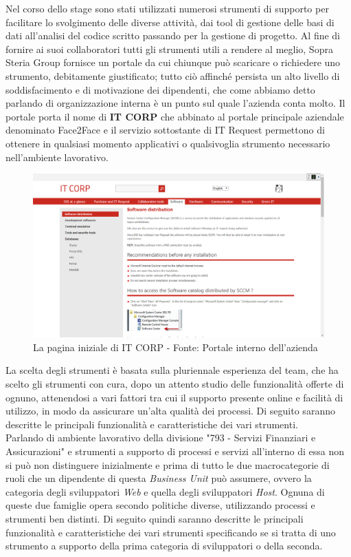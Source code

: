 	Nel corso dello stage sono stati utilizzati numerosi strumenti di supporto per facilitare lo svolgimento delle diverse attività, dai tool di gestione delle basi di dati all'analisi del codice scritto passando per la gestione di progetto. Al fine di fornire ai suoi collaboratori tutti gli strumenti utili a rendere al meglio, Sopra Steria Group fornisce un portale da cui chiunque può scaricare o richiedere uno strumento, debitamente giustificato; tutto ciò affinché persista un alto livello di soddisfacimento e di motivazione dei dipendenti, che come abbiamo detto parlando di organizzazione interna è un punto sul quale l'azienda conta molto. Il portale porta il nome di \textbf{IT CORP} che abbinato al portale principale aziendale denominato Face2Face e il servizio sottostante di IT Request permettono di ottenere in qualsiasi momento applicativi o qualsivoglia strumento necessario nell'ambiente lavorativo.

	\begin{figure}[H]
		\centering
	   	\includegraphics[width=1\textwidth]{immagini/ITCorp}
	   	\caption{La pagina iniziale di IT CORP - Fonte: Portale interno dell'azienda}
	\end{figure}
	
	La scelta degli strumenti è basata sulla pluriennale esperienza del team, che ha scelto gli strumenti con cura, dopo un attento studio delle funzionalità offerte di ognuno, attenendosi a vari fattori tra cui il supporto presente online e facilità di utilizzo, in modo da assicurare un'alta qualità dei processi. Di seguito saranno descritte le principali funzionalità e caratteristiche dei vari strumenti.\\

	Parlando di ambiente lavorativo della divisione "793 - Servizi Finanziari e Assicurazioni" e strumenti a supporto di processi e servizi all'interno di essa non si può non distinguere inizialmente e prima di tutto le due macrocategorie di ruoli che un dipendente di questa \textit{Business Unit} può assumere, ovvero la categoria degli sviluppatori \textit{Web} e quella degli sviluppatori \textit{Host}. Ognuna di queste due famiglie opera secondo politiche diverse, utilizzando processi e strumenti ben distinti. Di seguito quindi saranno descritte le principali funzionalità e caratteristiche dei vari strumenti specificando se si tratta di uno strumento a supporto della prima categoria di sviluppatori o della seconda.
	
